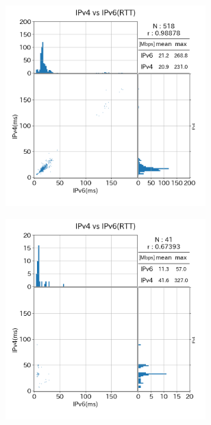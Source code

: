 \begin{figure}[htbp]
\begin{center}
\begin{minipage}[t]{0.48\textwidth}
\begin{center}
\begin{subfigure}[b]{\textwidth}
                    \includegraphics[width=0.85\textwidth]{fig/old_CATV_rtt.png}
                    \label{old_CATV_rtt}
                \end{subfigure}
                \begin{subfigure}[b]{\textwidth}
                    \centering
                    \includegraphics[width=0.85\textwidth]{fig/old_Mobile_rtt.png}
                    \label{old_Mobile_rtt}

\end{subfigure}
\end{center}
\end{minipage}
\end{center}
\end{figure}
